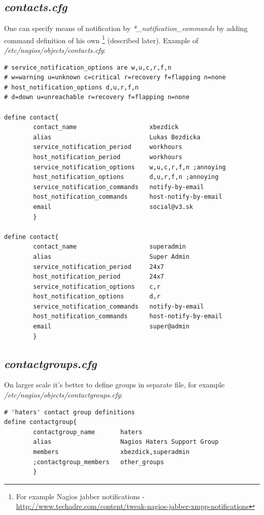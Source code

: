 \documentclass[10pt,a4paper,final]{report}
\begin{document}
\subsection{\emph{contacts.cfg}}
One can specify means of notification by \emph{*\_notification\_commands} by adding command definition of his own \footnote{For example Nagios jabber notifications -\url{http://www.techadre.com/content/tweak-nagios-jabber-xmpp-notifications}} (described later). Example of \emph{/etc/nagios/objects/contacts.cfg}:
\begin{lstlisting}
# service_notification_options are w,u,c,r,f,n
# w=warning u=unknown c=critical r=recovery f=flapping n=none
# host_notification_options d,u,r,f,n
# d=down u=unreachable r=recovery f=flapping n=none

define contact{
        contact_name                    xbezdick
        alias                           Lukas Bezdicka
        service_notification_period     workhours
        host_notification_period        workhours
        service_notification_options    w,u,c,r,f,n ;annoying
        host_notification_options       d,u,r,f,n ;annoying
        service_notification_commands   notify-by-email
        host_notification_commands      host-notify-by-email
        email                           social@v3.sk
        }

define contact{
        contact_name                    superadmin
        alias                           Super Admin
        service_notification_period     24x7
        host_notification_period        24x7
        service_notification_options    c,r
        host_notification_options       d,r
        service_notification_commands   notify-by-email
        host_notification_commands      host-notify-by-email
        email                           super@admin
        }
\end{lstlisting}

\subsection{\emph{contactgroups.cfg}}
On larger scale it's better to define groups in separate file, for example \emph{/etc/nagios/objects/contactgroups.cfg}:
\begin{lstlisting}
# 'haters' contact group definitions
define contactgroup{
        contactgroup_name       haters
        alias                   Nagios Haters Support Group
        members                 xbezdick,superadmin
        ;contactgroup_members   other_groups
        }
\end{lstlisting}
\end{document}
